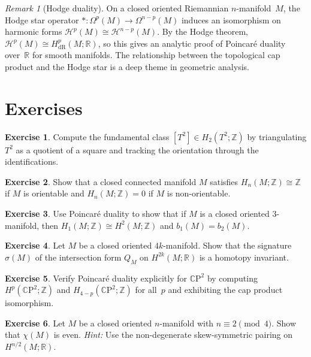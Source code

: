 \documentclass[12pt,a4paper,openany]{book}
\theoremstyle{definition}
\newtheorem{exercise}{Exercise}[chapter]
\theoremstyle{plain}
\theoremstyle{remark}
\newtheorem{remark}[definition]{Remark}
\newcommand{\Z}{\mathbb{Z}}
\newcommand{\R}{\mathbb{R}}
\newcommand{\CP}{\mathbb{C}\mathrm{P}}
\begin{document}
\begin{remark}[Hodge duality]
On a closed oriented Riemannian $n$-manifold~$M$, the Hodge star
operator $*\colon\Omega^p(M)\to\Omega^{n-p}(M)$ induces an isomorphism
on harmonic forms $\mathcal{H}^p(M)\cong\mathcal{H}^{n-p}(M)$.  By
the Hodge theorem, $\mathcal{H}^p(M)\cong H^p_{\mathrm{dR}}(M;\R)$,
so this gives an analytic proof of Poincar\'e duality over~$\R$ for
smooth manifolds.  The relationship between the topological cap product
and the Hodge star is a deep theme in geometric analysis.
\end{remark}

\section{Exercises}

\begin{exercise}
Compute the fundamental class $[T^2]\in H_2(T^2;\Z)$ by
triangulating $T^2$ as a quotient of a square and tracking the
orientation through the identifications.
\end{exercise}

\begin{exercise}
Show that a closed connected manifold $M$ satisfies
$H_n(M;\Z)\cong\Z$ if $M$ is orientable and $H_n(M;\Z)=0$ if $M$ is
non-orientable.
\end{exercise}

\begin{exercise}
Use Poincar\'e duality to show that if $M$ is a closed oriented
$3$-manifold, then $H_1(M;\Z)\cong H^2(M;\Z)$ and $b_1(M)=b_2(M)$.
\end{exercise}

\begin{exercise}
Let $M$ be a closed oriented $4k$-manifold.  Show that the signature
$\sigma(M)$ of the intersection form $Q_M$ on
$H^{2k}(M;\R)$ is a homotopy invariant.
\end{exercise}

\begin{exercise}
Verify Poincar\'e duality explicitly for $\CP^2$ by computing
$H^p(\CP^2;\Z)$ and $H_{4-p}(\CP^2;\Z)$ for all~$p$ and
exhibiting the cap product isomorphism.
\end{exercise}

\begin{exercise}
Let $M$ be a closed oriented $n$-manifold with $n\equiv 2\pmod{4}$.
Show that $\chi(M)$ is even.
\textit{Hint:} Use the non-degenerate skew-symmetric pairing on
$H^{n/2}(M;\R)$.
\end{exercise}
\end{document}
